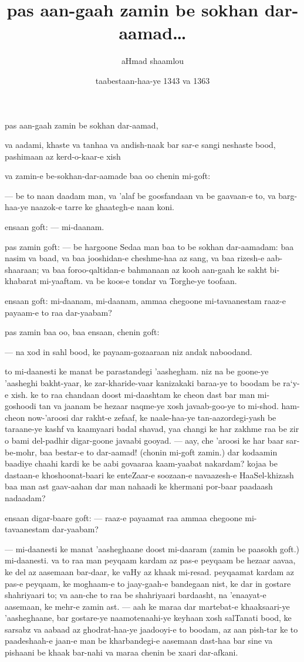 \documentclass{article}
\title{pas aan-gaah zamin be sokhan dar-aamad\dots}
\author{aHmad shaamlou}
\date{taabestaan-haa-ye 1343 va 1363}
\renewcommand{\*}{%
	\begin{center}*\end{center}
}
\begin{document}
\maketitle

pas aan-gaah zamin be sokhan dar-aamad,

va aadami, khaste va tanhaa va andish-naak bar sar-e sangi
neshaste bood, pashimaan az kerd-o-kaar-e xish

va zamin-e be-sokhan-dar-aamade baa oo chenin mi-goft:

--- be to naan daadam man, va 'alaf be goosfandaan va be gaavaan-e to,
va barg-haa-ye naazok-e tarre ke ghaategh-e naan koni.

ensaan goft: --- mi-daanam.

pas zamin goft: --- be hargoone Sedaa man baa to be sokhan dar-aamadam:
baa nasim va baad, va baa jooshidan-e cheshme-haa az sang, va baa
rizesh-e aab-shaaraan; va baa foroo-qaltidan-e bahmanaan az kooh aan-gaah
ke sakht bi-khabarat mi-yaaftam. va be koos-e tondar va Torghe-ye
toofaan.

ensaan goft: mi-daanam, mi-daanam, ammaa chegoone mi-tavaanestam raaz-e
payaam-e to raa dar-yaabam?

pas zamin baa oo, baa ensaan, chenin goft:

--- na xod in sahl bood, ke payaam-gozaaraan niz andak naboodand.

to mi-daanesti ke manat be parastandegi 'aashegham. niz na be goone-ye
'aasheghi bakht-yaar, ke zar-kharide-vaar kanizakaki baraa-ye to boodam
be ra`y-e xish. ke to raa chandaan doost mi-daashtam ke cheon dast bar
man mi-goshoodi tan va jaanam be hezaar naqme-ye xosh javaab-goo-ye
to mi-shod. ham-cheon now-'aroosi dar rakht-e zefaaf, ke naale-haa-ye
tan-aazordegi-yash be taraane-ye kashf va kaamyaari badal shavad, yaa
changi ke har zakhme raa be zir o bami del-padhir digar-goone javaabi
gooyad. --- aay, che 'aroosi ke har baar sar-be-mohr, baa bestar-e to
dar-aamad! (chonin mi-goft zamin.) dar kodaamin baadiye chaahi kardi ke
be aabi govaaraa kaam-yaabat nakardam? kojaa be dastaan-e
khoshoonat-baari ke enteZaar-e soozaan-e navaazesh-e HaaSel-khizash
baa man ast gaav-aahan dar man nahaadi ke khermani por-baar paadaash
nadaadam?

ensaan digar-baare goft: --- raaz-e payaamat raa ammaa chegoone
mi-tavaanestam dar-yaabam?

--- mi-daanesti ke manat 'aasheghaane doost mi-daaram (zamin be paasokh
goft.) mi-daanesti. va to raa man peyqaam kardam az pas-e peyqaam be
hezaar aavaa, ke del az aasemaan bar-daar, ke vaHy az khaak mi-resad.
peyqaamat kardam az pas-e peyqaam, ke moghaam-e to jaay-gaah-e
bandegaan nist, ke dar in gostare shahriyaari to; va aan-che to raa be
shahriyaari bardaasht, na 'enaayat-e aasemaan, ke mehr-e zamin ast. ---
aah ke maraa dar martebat-e khaaksaari-ye 'aasheghaane, bar gostare-ye
naamotenaahi-ye keyhaan xosh salTanati bood, ke sarsabz va aabaad az
ghodrat-haa-ye jaadooyi-e to boodam, az aan pish-tar ke to paadeshaah-e
jaan-e man be kharbandegi-e aasemaan dast-haa bar sine va pishaani be
khaak bar-nahi va maraa chenin be xaari dar-afkani.
\end{document}
